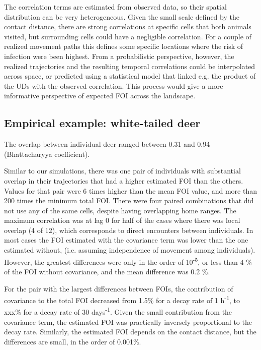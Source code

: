 \documentclass[letterpaper]{article}
\begin{document}
The correlation terms are estimated from observed data, so their spatial distribution can be very heterogeneous. Given the small scale defined by the contact distance, there are strong correlations at  specific cells that both animals visited, but surrounding cells could have a negligible correlation. 
For a couple of realized movement paths this defines some specific locations where the risk of infection were been highest. From a probabilistic perspective, however, the realized trajectories and the resulting temporal correlations could be interpolated across space, or predicted using a statistical model that linked e.g. the product of the UDs with the observed correlation. This process would give a more informative perspective of expected FOI across the landscape. 



\subsection*{Empirical example: white-tailed deer}
The overlap between individual deer ranged between 0.31 and 0.94 (Bhattacharyya coefficient). 

Similar to our simulations, there was one pair of individuals with substantial overlap in their trajectories that had a higher estimated FOI than the others. Values for that pair were 6 times higher than the mean FOI value, and more than 200 times the minimum total FOI. 
There were four paired combinations that did not use any of the same cells, despite having overlapping home ranges. %
The maximum correlation was at lag 0 for half of the cases where there was local overlap (4 of 12), which corresponds to direct encounters between individuals.
In most cases the FOI estimated with the covariance term was lower than the one estimated without, (i.e. assuming independence of movement among individuals). However, the greatest differences were only in the order of 10\textsuperscript{-5}, or less than 4 \% of the FOI without covariance, and the mean difference was 0.2 \%.


For the pair with the largest differences between FOIs, the contribution of covariance to the total FOI decreased from 1.5\% for a decay rate of 1 h\textsuperscript{-1}, to xxx\% for a decay rate of 30 days\textsuperscript{-1}.
Given the small contribution from the covariance term, the estimated FOI was practically inversely proportional to the decay rate. 
Similarly, the estimated FOI depends on the contact distance, but the differences are small, in the order of 0.001\%. 
\end{document}
